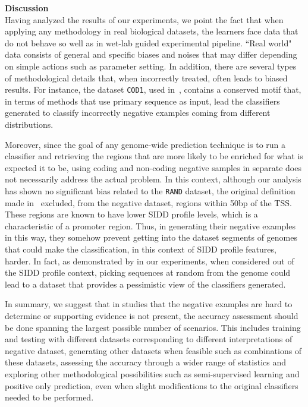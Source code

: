 \documentclass{sig-alternate}
\theoremstyle{plain}
\begin{document}
\noindent
{\bf Discussion} \\

Having analyzed the results of our experiments, we point the fact that when applying any methodology in real biological datasets, the learners face data that do not behave so well as in wet-lab guided experimental pipeline. ``Real world" data consists of general and specific biases and noises that may differ depending on simple actions such as parameter setting. In addition, there are several  types of methodological details that, when incorrectly treated, often leads to biased results. For instance, the dataset {\tt COD1}, used in~\cite{gordon2003,song2011a}, contains a conserved motif that, in terms of methods that use primary sequence as input,  lead the classifiers generated to classify incorrectly  negative examples coming from different distributions. 

Moreover,  since the goal of any genome-wide prediction technique is to run a classifier  and retrieving the regions that are more likely to be enriched for what is expected it to be, using coding and non-coding negative samples in separate does not necessarily address the actual problem. In this context, although our analysis has shown no significant bias related to the {\tt RAND} dataset, the original definition made in~\cite{bland2010} excluded, from the negative dataset, regions within 50bp of the TSS. These regions are known to have lower SIDD profile levels, which is a characteristic of a promoter region. Thus,  in generating their negative examples in this way, they somehow prevent  getting into the dataset segments of genomes that could make the classification, in this context of SIDD profile features,  harder. In fact, as demonstrated by in our experiments,  when considered out of the SIDD profile context, picking sequences  at random from the genome could lead to a dataset that  provides a pessimistic view of the classifiers generated.

In summary, we suggest that in studies that the negative examples are hard to determine or supporting evidence is not present, the accuracy assessment should be done spanning the largest possible number of scenarios. This includes training and testing with different datasets corresponding to different interpretations of negative dataset, generating other datasets when feasible such as combinations of these datasets, assessing the accuracy through a wider range of statistics and exploring other methodological possibilities such as semi-supervised learning and positive only prediction, even when slight modifications to the original classifiers needed to be performed.
\end{document}
